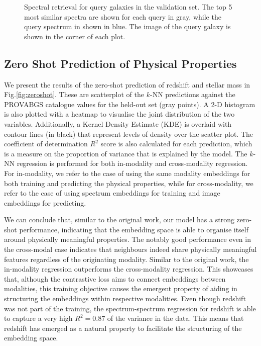 \documentclass[a4paper,12pt]{article}
\begin{document}
\begin{figure}[H]

    \caption{Spectral retrieval for query galaxies in the validation set. The top 5 most similar spectra are shown for each query in gray, while the query spectrum in shown in blue. The image of the query galaxy is shown in the corner of each plot.
    }
    \label{fig:spectral_retrieval}
\end{figure}




\subsection{Zero Shot Prediction of Physical Properties}
We present the results of the zero-shot prediction of redshift and stellar mass in Fig.\ref{fig:zeroshot}. These are scatterplot of the $k$-NN predictions against the PROVABGS catalogue values for the held-out set (gray points). A 2-D histogram is also plotted with a heatmap to visualise the joint distribution of the two variables. Additionally, a Kernel Density Estimate (KDE) is overlaid with contour lines (in black) that represent levels of density over the scatter plot. The coefficient of determination $R^2$ score is also calculated for each prediction, which is a measure on the proportion of variance that is explained by the model. The $k$-NN regression is performed for both in-modality and cross-modality regression. For in-modality, we refer to the case of using the same modality embeddings for both training and predicting the physical properties, while for cross-modality, we refer to the case of using spectrum embeddings for training and image embeddings for predicting. 

We can conclude that, similar to the original work, our model has a strong zero-shot performance, indicating that the embedding space is able to organise itself around physically meaningful properties. The notably good performance even in the cross-modal case indicates that neighbours indeed share physically meaningful features regardless of the originating modality. Similar to the original work, the in-modality regression outperforms the cross-modality regression. This showcases that, although the contrastive loss aims to connect embeddings between modalities, this training objective causes the emergent property of aiding in structuring the embeddings within respective modalities. Even though redshift was not part of the training, the spectrum-spectrum regression for redshift is able to capture a very high $R^2 = 0.87$ of the variance in the data. This means that redshift has emerged as a natural property to facilitate the structuring of the embedding space.
\end{document}
